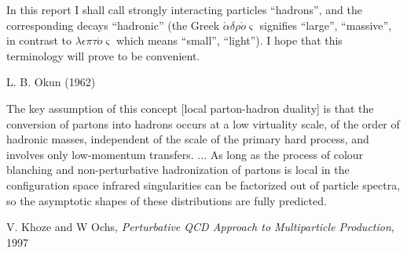 \epigraph{
In this report I shall call strongly interacting particles ``hadrons'', and the corresponding decays ``hadronic'' (the Greek \(\acute{\alpha}\delta \rho \acute{o}\varsigma\) signifies ``large'', ``massive'', in contrast to \(\lambda \epsilon \pi \tau \acute{o} \varsigma\) which means ``small'', ``light''). I hope that this terminology will prove to be convenient.}{L. B. Okun (1962)}



\epigraph{
    The key assumption of this concept [local parton-hadron duality] is that the conversion of partons into hadrons occurs at a low virtuality scale, of the order of hadronic masses, independent of the scale of the primary hard process, and involves only low-momentum transfers.
    ...
    As long as the process of colour blanching and non-perturbative hadronization of partons is local in the configuration space infrared singularities can be factorized out of particle spectra, so the asymptotic shapes of these distributions are fully predicted.
}
{V. Khoze and W Ochs, \textit{Perturbative QCD Approach to Multiparticle Production}, 1997 \cite{}}

\iffalse
\epigraph{
    A short time scale, of the order of the inverse of the large momenta in the process, characterizes the hard collisions of the constituents.
    A long time scale, of the order of the typical hadron radius, characterizes the binding and recombination of the constituents.
    The short time scale physics depends on the process, but is calculable.
    The long time scale physics contains all the complexity of the bound state problem, but it is independent of the process.
}
{
        \textit{Perturbation Theory and the Parton Model in QCD} (1978),
    R.K Ellis, H. Georgi, M. Machacek, H.D. Politzer, G.G. Ross
        \cite{}
}
\fi



